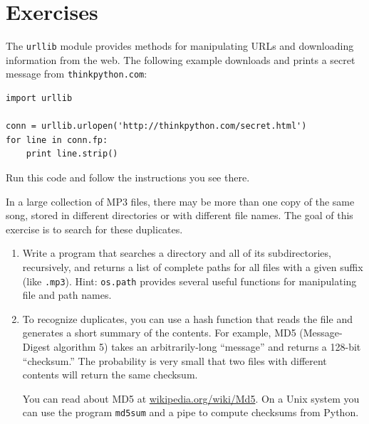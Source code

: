 \documentclass[10pt]{book}
\begin{document}
\section{Exercises}

\begin{ex}
\label{urllib}


The {\tt urllib} module provides methods for manipulating URLs
and downloading information from the web.  The following example
downloads and prints a secret message from {\tt thinkpython.com}:

\beforeverb
\begin{verbatim}
import urllib

conn = urllib.urlopen('http://thinkpython.com/secret.html')
for line in conn.fp:
    print line.strip()
\end{verbatim}
\afterverb

Run this code and follow the instructions you see there.


\end{ex}

\begin{ex}
\label{checksum}


In a large collection of MP3 files, there may be more than one
copy of the same song, stored in different directories or with
different file names.  The goal of this exercise is to search for
these duplicates.

\begin{enumerate}

\item Write a program that searches a directory and all of its
subdirectories, recursively, and returns a list of complete paths
for all files with a given suffix (like {\tt .mp3}).
Hint: {\tt os.path} provides several useful functions for
manipulating file and path names.


\item To recognize duplicates, you can use a hash function that
reads the file and generates a short summary
of the contents.  For example,
MD5 (Message-Digest algorithm 5) takes an arbitrarily-long
``message'' and returns a 128-bit ``checksum.''  The probability
is very small that two files with different contents will
return the same checksum.

You can read about MD5 at \url{wikipedia.org/wiki/Md5}.  On
a Unix system you can use the program {\tt md5sum} and a pipe to
compute checksums from Python.


\end{enumerate}

\end{ex}
\end{document}
